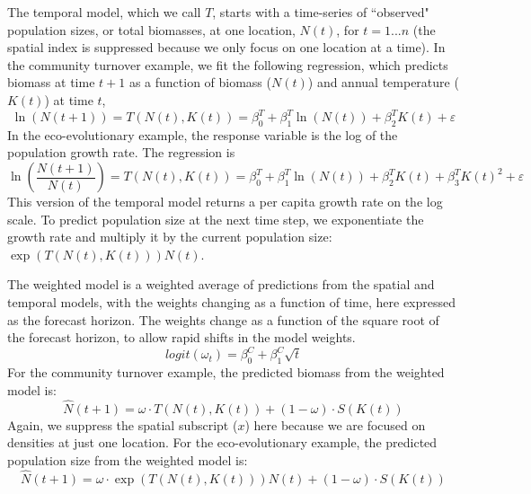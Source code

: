 \documentclass[11pt]{article}
\begin{document}
The temporal model, which we call $T$, starts with a time-series of ``observed" population sizes, or total biomasses, at one location, $N(t)$, for $t=1...n$ (the spatial index is suppressed because we only focus on one location at a time). In the community turnover example, we fit the following regression, which predicts biomass at time $t+1$ as a function of biomass ($N(t)$) and annual temperature ($K(t)$) at time $t$,
\begin{equation}
\ln(N(t+1)) = T(N(t),K(t)) = \beta^T_0 +  \beta^T_1 \ln(N(t)) +\beta^T_2 K(t)  +  \varepsilon
\label{eqn:temporal_regression_community1}
\end{equation}
In the eco-evolutionary example, the response variable is the log of the population growth rate. The regression is 
\begin{equation}
\ln\left(\frac{N(t+1)}{N(t)}\right) = T(N(t),K(t)) = \beta^T_0 +  \beta^T_1 \ln(N(t)) +\beta^T_2 K(t)  +\beta^T_3 K(t)^2 +  \varepsilon
\label{eqn:temporal_regression_ecoevo2}
\end{equation}
This version of the temporal model returns a per capita growth rate on the log scale. To predict population size at the next time step, we exponentiate the growth rate and multiply it by the current population size: $\exp(T(N(t),K(t))) N(t)$.

The weighted model is a weighted average of predictions from the spatial and temporal models, with the weights changing as a function of time, here expressed as the forecast horizon. The weights change as a function of the square root of the forecast horizon, to allow rapid shifts in the model weights. 
\begin{equation}
logit(\omega_t)=\beta^C_0 + \beta^C_1 \sqrt{t}
\label{eqn:weights}
\end{equation}
For the community turnover example, the predicted biomass from the weighted model is:
\begin{equation}
\hat{N}(t+1)= \omega \cdot T(N(t),K(t)) + (1-\omega) \cdot S(K(t)) 
\label{eqn:combined_model1}
\end{equation}
Again, we suppress the spatial subscript ($x$) here because we are focused on densities at just one location. For the eco-evolutionary example, the predicted population size from the weighted model is:
\begin{equation}
\hat{N}(t+1) = \omega \cdot \exp(T(N(t),K(t))) N(t) + (1-\omega) \cdot S(K(t)) 
\label{eqn:combined_model2}
\end{equation}
\end{document}
